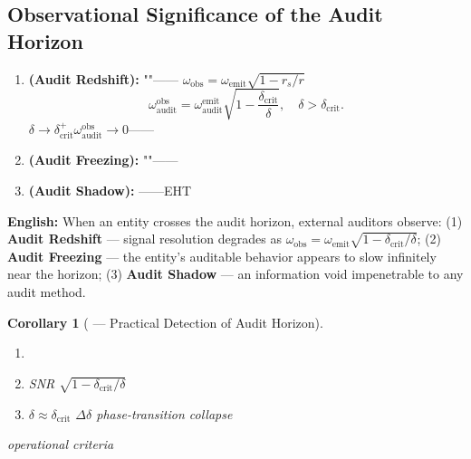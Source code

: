 \documentclass[12pt,a4paper]{article}
\newtheorem{corollary}[theorem]{Corollary}
\theoremstyle{remark}
\begin{document}
\subsection{}
\subsection{Observational Significance of the Audit Horizon}

\noindent
\textbf{} 

\begin{enumerate}[label=(\arabic*)]
    \item \textbf{ (Audit Redshift):} ""—— $\omega_{\mathrm{obs}} = \omega_{\mathrm{emit}}\sqrt{1 - r_s/r}$
    \begin{equation}
        \omega_{\mathrm{audit}}^{\mathrm{obs}} = \omega_{\mathrm{audit}}^{\mathrm{emit}} \sqrt{1 - \frac{\delta_{\mathrm{crit}}}{\delta}}, \quad \delta > \delta_{\mathrm{crit}}.
        \label{eq:audit_redshift}
    \end{equation}
     $\delta \to \delta_{\mathrm{crit}}^+$$\omega_{\mathrm{audit}}^{\mathrm{obs}} \to 0$——
    
    \item \textbf{ (Audit Freezing):} ""——
    
    \item \textbf{ (Audit Shadow):} ——EHT
\end{enumerate}

\vspace{4pt}
\noindent
\textbf{English:} When an entity crosses the audit horizon, external auditors observe: (1) \textbf{Audit Redshift} — signal resolution degrades as $\omega_{\mathrm{obs}} = \omega_{\mathrm{emit}}\sqrt{1-\delta_{\mathrm{crit}}/\delta}$; (2) \textbf{Audit Freezing} — the entity's auditable behavior appears to slow infinitely near the horizon; (3) \textbf{Audit Shadow} — an information void impenetrable to any audit method.

\begin{corollary}[ — Practical Detection of Audit Horizon]\label{cor:detect_horizon}

\begin{enumerate}[label=(\alph*)]
    \item 
    \item SNR $\sqrt{1-\delta_{\mathrm{crit}}/\delta}$ 
    \item  $\delta \approx \delta_{\mathrm{crit}}$  $\Delta\delta$ phase-transition collapse
\end{enumerate}
\textbf{}operational criteria
\end{corollary}
\end{document}
